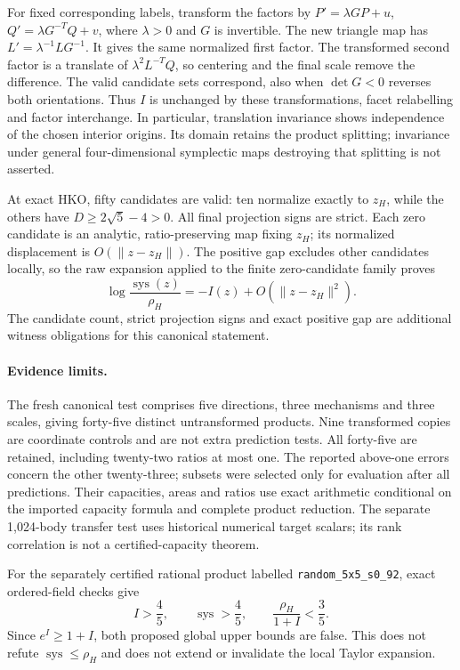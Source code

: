 For fixed corresponding labels, transform the factors by
$P'=\lambda GP+u$, $Q'=\lambda G^{-T}Q+v$,
where $\lambda>0$ and $G$ is invertible.
The new triangle map has $L'=\lambda^{-1}LG^{-1}$.
It gives the same normalized first factor. The transformed second factor
is a translate of $\lambda^2L^{-T}Q$, so centering and the final scale
remove the difference. The valid candidate sets correspond, also when
$\det G<0$ reverses both orientations. Thus $I$ is unchanged by these
transformations, facet relabelling and factor interchange. In particular,
translation invariance shows independence of the chosen interior origins. Its domain
retains the product splitting; invariance under general four-dimensional
symplectic maps destroying that splitting is not asserted.

At exact HKO, fifty candidates are valid: ten normalize exactly to $z_H$,
while the others have $D\geq2\sqrt5-4>0$. All final projection signs are
strict. Each zero candidate is an analytic, ratio-preserving map fixing
$z_H$; its normalized displacement is $O(\|z-z_H\|)$.
The positive gap excludes other candidates locally, so the raw expansion
applied to the finite zero-candidate family proves
\[
 \log\frac{\operatorname{sys}(z)}{\rho_H}
             =-I(z)+O(\|z-z_H\|^2).
\]
The candidate count, strict projection signs and exact positive gap are
additional witness obligations for this canonical statement.

\paragraph{Evidence limits.}
The fresh canonical test comprises five directions, three mechanisms and
three scales, giving forty-five distinct untransformed products. Nine
transformed copies are coordinate controls and are not extra prediction
tests. All forty-five are retained, including twenty-two ratios at most
one. The reported above-one errors concern the other twenty-three;
subsets were selected only for evaluation after all predictions.
Their capacities, areas and ratios use exact arithmetic conditional on
the imported capacity formula and complete product reduction.
The separate 1,024-body transfer test uses historical numerical target
scalars; its rank correlation is not a certified-capacity theorem.

For the separately certified rational product labelled
\texttt{random\_5x5\_s0\_92}, exact ordered-field checks give
\[
 I>\frac45,\qquad \operatorname{sys}>\frac45,\qquad
 \frac{\rho_H}{1+I}<\frac35.
\]
Since $e^I\geq1+I$, both proposed global upper bounds are false.
This does not refute $\operatorname{sys}\leq\rho_H$ and does not extend
or invalidate the local Taylor expansion.
